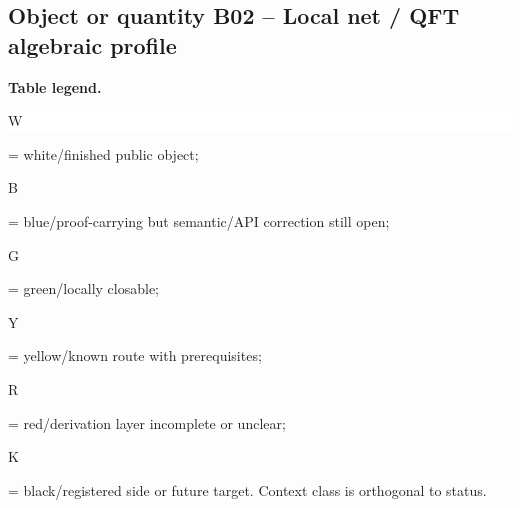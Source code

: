 \subsection*{Object or quantity B02 -- Local net /\allowbreak{} QFT algebraic profile}
\hypertarget{objproof:B02}{}
\par\smallskip\noindent\begin{minipage}{0.99\linewidth}\footnotesize\raggedright\textbf{Table legend.} \colorbox{white}{\strut W} = white/finished public object; \colorbox{cyan!20}{\strut B} = blue/proof-carrying but semantic/API correction still open; \colorbox{green!18}{\strut G} = green/locally closable; \colorbox{yellow!25}{\strut Y} = yellow/known route with prerequisites; \colorbox{red!20}{\strut R} = red/derivation layer incomplete or unclear; \colorbox{black!18}{\strut K} = black/registered side or future target. Context class is orthogonal to status.\end{minipage}\par\vspace{0.25em}
